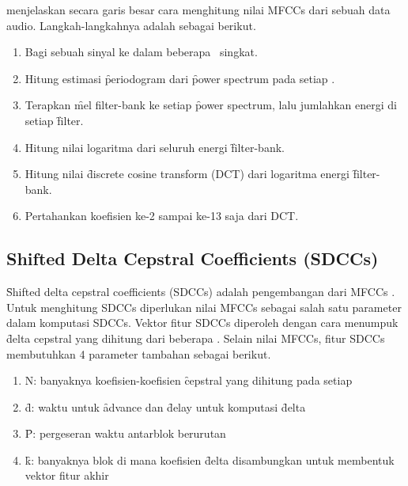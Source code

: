   \cite{hitungmfcc} menjelaskan secara garis besar cara menghitung nilai MFCCs dari sebuah data audio. Langkah-langkahnya adalah sebagai berikut.
  \begin{enumerate}
    \item Bagi sebuah sinyal ke dalam beberapa \fr~singkat.
    \item Hitung estimasi \f{periodogram} dari \f{power spectrum} pada setiap \fr.
    \item Terapkan \f{mel filter-bank} ke setiap \f{power spectrum}, lalu jumlahkan energi di setiap \f{filter}.
    \item Hitung nilai logaritma dari seluruh energi \f{filter-bank}.
    \item Hitung nilai \f{discrete cosine transform} (DCT) dari logaritma energi \f{filter-bank}.
    \item Pertahankan koefisien ke-2 sampai ke-13 saja dari DCT.
  \end{enumerate}



	\subsection{Shifted Delta Cepstral Coefficients (SDCCs)}  \label{teorisdcc}
  \f{Shifted delta cepstral coefficients (SDCCs)} adalah pengembangan dari MFCCs \citep{torres2002approaches}. Untuk menghitung SDCCs diperlukan nilai MFCCs sebagai salah satu parameter dalam komputasi SDCCs. Vektor fitur SDCCs diperoleh dengan cara menumpuk \f{delta cepstral} yang dihitung dari beberapa \fr. Selain nilai MFCCs, fitur SDCCs membutuhkan 4 parameter tambahan sebagai berikut.
  \begin{enumerate}
    \item N: banyaknya koefisien-koefisien \f{cepstral} yang dihitung pada setiap \fr
    \item \f{d}: waktu untuk \f{advance} dan \f{delay} untuk komputasi \f{delta}
    \item \f{P}: pergeseran waktu antarblok berurutan
    \item \f{k}: banyaknya blok di mana koefisien \f{delta} disambungkan untuk membentuk vektor fitur akhir
  \end{enumerate}
  
